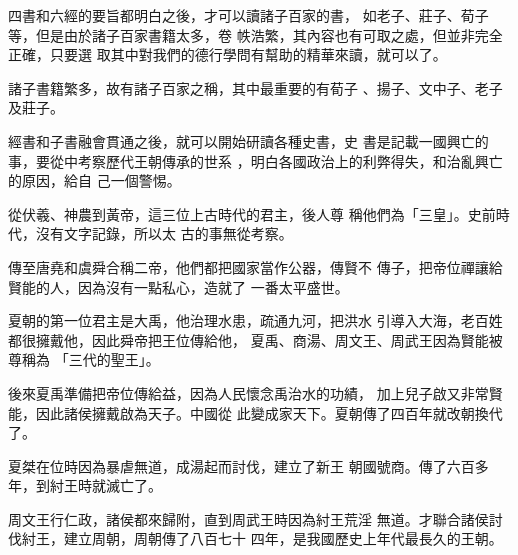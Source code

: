 \documentclass[avery5371,grid]{flashcards}
\begin{document}
{四書和六經的要旨都明白之後，才可以讀諸子百家的書，
如老子、莊子、荀子等，但是由於諸子百家書籍太多，卷
帙浩繁，其內容也有可取之處，但並非完全正確，只要選
取其中對我們的德行學問有幫助的精華來讀，就可以了。} %
{} %

{諸子書籍繁多，故有諸子百家之稱，其中最重要的有荀子
、揚子、文中子、老子及莊子。} %
{} %

{經書和子書融會貫通之後，就可以開始研讀各種史書，史
書是記載一國興亡的事，要從中考察歷代王朝傳承的世系
，明白各國政治上的利弊得失，和治亂興亡的原因，給自
己一個警惕。} %
{} %

{從伏羲、神農到黃帝，這三位上古時代的君主，後人尊
稱他們為「三皇」。史前時代，沒有文字記錄，所以太
古的事無從考察。} %
{} %

{傳至唐堯和虞舜合稱二帝，他們都把國家當作公器，傳賢不
傳子，把帝位禪讓給賢能的人，因為沒有一點私心，造就了
一番太平盛世。} %
{} %

{夏朝的第一位君主是大禹，他治理水患，疏通九河，把洪水
引導入大海，老百姓都很擁戴他，因此舜帝把王位傳給他，
夏禹、商湯、周文王、周武王因為賢能被尊稱為
「三代的聖王」。} %
{} %







{後來夏禹準備把帝位傳給益，因為人民懷念禹治水的功績，
加上兒子啟又非常賢能，因此諸侯擁戴啟為天子。中國從
此變成家天下。夏朝傳了四百年就改朝換代了。} %
{} %

{夏桀在位時因為暴虐無道，成湯起而討伐，建立了新王
朝國號商。傳了六百多年，到紂王時就滅亡了。} %
{} %

{周文王行仁政，諸侯都來歸附，直到周武王時因為紂王荒淫
無道。才聯合諸侯討伐紂王，建立周朝，周朝傳了八百七十
四年，是我國歷史上年代最長久的王朝。} %
{} %
\end{document}
